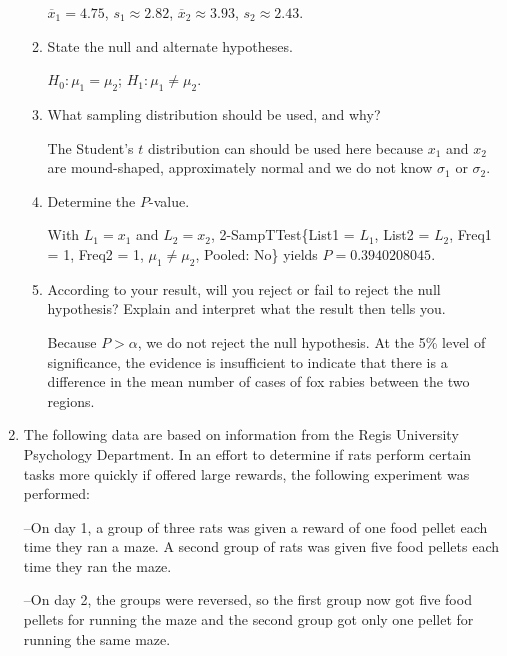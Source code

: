 \begin{enumerate}
\begin{enumerate}
	{\answer $\overline{x}_1=4.75$, $s_1\approx 2.82$, $\overline{x}_2\approx 3.93$, $s_2\approx 2.43$.}  
	
	\vfill
	
	\item  State the null and alternate hypotheses.  
	
	{\answer $H_0: \mu_1=\mu_2$; $H_1: \mu_1 \neq \mu_2$.}  
	
	\vfill
	
	\item What sampling distribution should be used, and why?  
	
	{\answer The Student's $t$ distribution can should be used here because $x_1$ and $x_2$ are mound-shaped, approximately normal and we do not know $\sigma_1$ or $\sigma_2$.}  
	
	\vfill
	
	\item Determine the $P$-value. 
	
	{\answer With $L_1 = x_1$ and $L_2 = x_2$,  2-SampTTest\{List1 = $L_1$, List2 = $L_2$, Freq1 = 1, Freq2 = 1, $\mu_1 \neq \mu_2$, Pooled: No\} yields $P = 0.3940208045$.}  
	
	\vfill
	
	\item According to your result, will you reject or fail to reject the null hypothesis?  Explain and interpret what the result then tells you.  
	
	{\answer Because $P>\alpha$, we do not reject the null hypothesis. At the 5\% level of significance, the evidence is insufficient to indicate that there is a difference in the mean number of cases of fox rabies between the two regions.}  
	
	\vfill
	
	\end{enumerate}
	
\newpage

\item The following data are based on information from the Regis University Psychology Department.  In an effort to determine if rats perform certain tasks more quickly if offered large rewards, the following experiment was performed: 

--On day 1, a group of three rats was given a reward of one food pellet each time they ran a maze.  A second group of rats was given five food pellets each time they ran the maze.  

--On day 2, the groups were reversed, so the first group now got five food pellets for running the maze and the second group got only one pellet for running the same maze. 


\end{enumerate}
